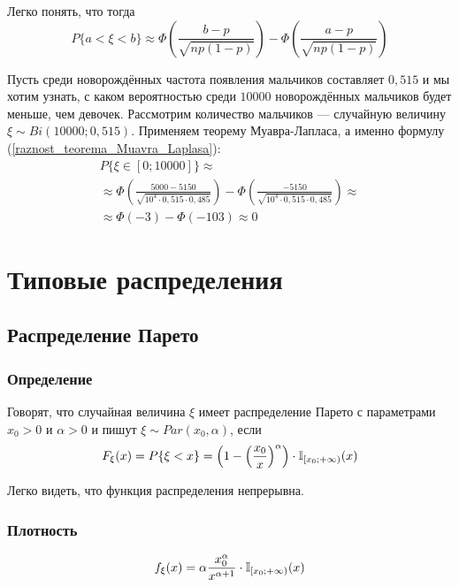 Легко понять, что тогда
\begin{equation}\label{raznost_teorema_Muavra_Laplasa}
P\{a<\xi<b\} \approx \Phi\left( \frac{b-p}{\sqrt{np(1-p)}} \right) - \Phi\left( \frac{a-p}{\sqrt{np(1-p)}} \right)
\end{equation}

\begin{primer}
Пусть среди новорождённых частота появления мальчиков составляет $0,515$ и мы хотим узнать, с каком вероятностью среди $10000$ новорождённых мальчиков будет меньше, чем девочек.
Рассмотрим количество мальчиков --- случайную величину $\xi \sim Bi(10000; 0,515)$.
Применяем теорему Муавра-Лапласа, а именно формулу (\ref{raznost_teorema_Muavra_Laplasa}):
\begin{multline*}
P\{\xi\in[0; 10000]\} \approx
\\ \approx
\Phi\left( \frac{5000-5150}{\sqrt{10^4 \cdot 0,515 \cdot 0,485 }} \right) - \Phi\left( \frac{-5150}{\sqrt{10^4 \cdot 0,515 \cdot 0,485 }} \right) \approx
\\ \approx
\Phi(-3) - \Phi(-103) \approx 0
\end{multline*}

\end{primer}

\chapter{Типовые распределения}
\section{Распределение Парето}
\subsection{Определение}
\opred
Говорят, что случайная величина $\xi$ имеет распределение Парето с параметрами $x_0>0$ и $\alpha>0$ и пишут $\xi \sim Par(x_0,\alpha)$, если
$$
F_\xi (x) = P\{\xi < x\} = \left(1 - \left(\frac{x_0}{x}\right)^\alpha\right) \cdot \mathbb{I}_{[x_0; +\infty)}(x)
$$

Легко видеть, что функция распределения непрерывна.
\subsection{Плотность}
$$
f_\xi (x) = \alpha\frac{x_0^\alpha}{x^{\alpha+1}} \cdot \mathbb{I}_{[x_0; +\infty)}(x)
$$


